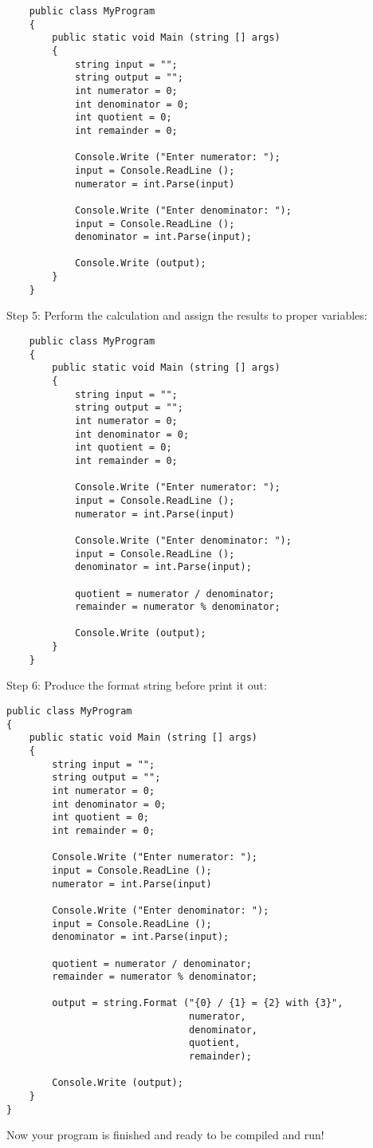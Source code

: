 \documentclass[../main.tex]{subfiles}
\begin{document}
\begin{verbatim}
    public class MyProgram
    {
        public static void Main (string [] args)
        {
            string input = "";
            string output = "";
            int numerator = 0;
            int denominator = 0;
            int quotient = 0;
            int remainder = 0;

            Console.Write ("Enter numerator: ");
            input = Console.ReadLine ();
            numerator = int.Parse(input)

            Console.Write ("Enter denominator: ");
            input = Console.ReadLine ();
            denominator = int.Parse(input);

            Console.Write (output);
        }
    }
\end{verbatim}

Step 5: Perform the calculation and assign the results to proper variables:

\begin{verbatim}
    public class MyProgram
    {
        public static void Main (string [] args)
        {
            string input = "";
            string output = "";
            int numerator = 0;
            int denominator = 0;
            int quotient = 0;
            int remainder = 0;

            Console.Write ("Enter numerator: ");
            input = Console.ReadLine ();
            numerator = int.Parse(input)

            Console.Write ("Enter denominator: ");
            input = Console.ReadLine ();
            denominator = int.Parse(input);

            quotient = numerator / denominator;
            remainder = numerator % denominator;

            Console.Write (output);
        }
    }
\end{verbatim}

Step 6: Produce the format string before print it out:

\begin{verbatim}
public class MyProgram
{
    public static void Main (string [] args)
    {
        string input = "";
        string output = "";
        int numerator = 0;
        int denominator = 0;
        int quotient = 0;
        int remainder = 0;

        Console.Write ("Enter numerator: ");
        input = Console.ReadLine ();
        numerator = int.Parse(input)

        Console.Write ("Enter denominator: ");
        input = Console.ReadLine ();
        denominator = int.Parse(input);

        quotient = numerator / denominator;
        remainder = numerator % denominator;

        output = string.Format ("{0} / {1} = {2} with {3}",
                                numerator,
                                denominator,
                                quotient,
                                remainder);

        Console.Write (output);
    }
}
\end{verbatim}

Now your program is finished and ready to be compiled and run!
\end{document}
